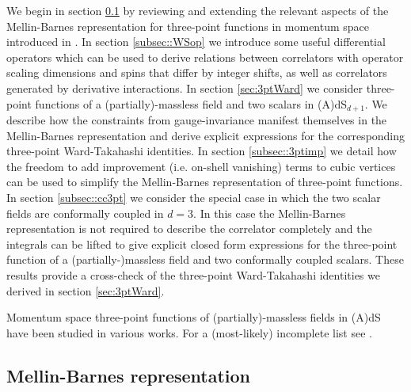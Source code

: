 \documentclass[11pt,a4paper]{article}
\begin{document}
We begin in section \ref{subsec::MBrep} by reviewing and extending the relevant aspects of the Mellin-Barnes representation for three-point functions in momentum space introduced in \cite{Sleight:2019mgd,Sleight:2019hfp}. In section \ref{subsec::WSop} we introduce some useful differential operators which can be used to derive relations between correlators with operator scaling dimensions and spins that differ by integer shifts, as well as correlators generated by derivative interactions. In section \ref{sec:3ptWard} we consider three-point functions of a (partially)-massless field and two scalars in (A)dS$_{d+1}$. We describe how the constraints from gauge-invariance manifest themselves in the Mellin-Barnes representation and derive explicit expressions for the corresponding three-point Ward-Takahashi identities. In section \ref{subsec::3ptimp} we detail how the freedom to add improvement (i.e. on-shell vanishing) terms to cubic vertices can be used to simplify the Mellin-Barnes representation of three-point functions. In section \ref{subsec::cc3pt} we consider the special case in which the two scalar fields are conformally coupled in $d=3$. In this case the Mellin-Barnes representation is not required to describe the correlator completely and the integrals can be lifted to give explicit closed form expressions for the three-point function of a (partially-)massless field and two conformally coupled scalars. These results provide a cross-check of the three-point Ward-Takahashi identities we derived in section \ref{sec:3ptWard}.


Momentum space three-point functions of (partially)-massless fields in (A)dS have been studied in various works. For a (most-likely) incomplete list see \cite{Maldacena:2002vr,Maldacena:2011nz,Bzowski:2011ab,Mata:2012bx,Bzowski:2013sza,Arkani-Hamed:2015bza,Bzowski:2017poo,Anninos:2017eib,Coriano:2018bbe,Goon:2018fyu,Coriano:2018bsy,Bzowski:2018fql,Farrow:2018yni,Isono:2019ihz,Sleight:2019hfp,Lipstein:2019mpu,Baumann:2020dch}. 


\subsection{Mellin-Barnes representation}
\label{subsec::MBrep}
\end{document}
